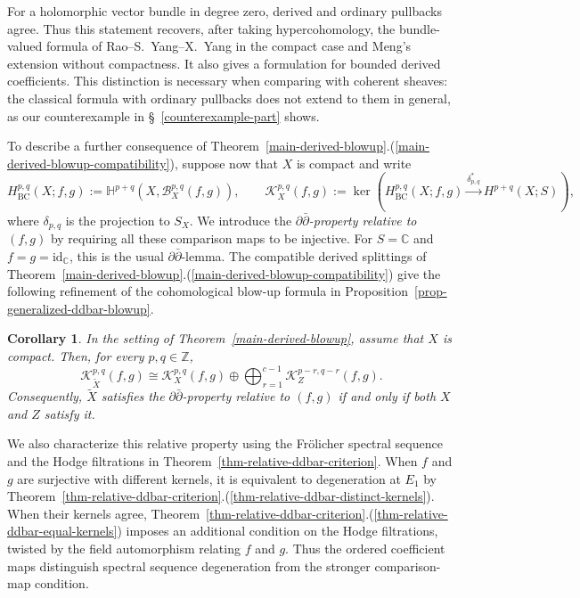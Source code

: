 \documentclass[11pt]{amsart}
\numberwithin{equation}{section}
\theoremstyle{plain}
\newtheorem{cor}[thm]{Corollary}
\theoremstyle{definition}
\begin{document}
For a holomorphic vector bundle in degree zero, derived and ordinary
pullbacks agree.  Thus this statement recovers, after taking
hypercohomology, the bundle-valued formula of Rao--S.~Yang--X.~Yang in the
compact case and Meng's extension without compactness.  It also gives
a formulation for bounded derived coefficients.  This distinction is
necessary when comparing with coherent sheaves: the classical formula
with ordinary pullbacks does not extend to them in general, as our
counterexample in \S~\ref{counterexample-part} shows.

To describe a further consequence of
Theorem~\ref{main-derived-blowup}.(\ref{main-derived-blowup-compatibility}),
suppose now that $X$ is compact and
write
\[
H^{p,q}_{\mathrm{BC}}(X;f,g)
:=\mathbb H^{p+q}(X,\mathcal B_X^{p,q}(f,g)),\qquad
\mathcal K_X^{p,q}(f,g):=
\ker\!\left(H^{p,q}_{\mathrm{BC}}(X;f,g)
\xrightarrow{\delta_{p,q}^*}H^{p+q}(X;S)\right),
\]
where $\delta_{p,q}$ is the projection to $S_X$.
We introduce the \emph{$\partial\bar\partial$-property relative to
$(f,g)$} by requiring all these comparison maps to be injective.
For $S=\mathbb C$ and $f=g=\mathrm{id}_{\mathbb C}$, this is the
usual $\partial\bar\partial$-lemma.  The compatible derived splittings of
Theorem~\ref{main-derived-blowup}.(\ref{main-derived-blowup-compatibility}) give
the following refinement of the cohomological blow-up formula in
Proposition~\ref{prop-generalized-ddbar-blowup}.

\begin{cor}\label{cor-main-relative-blowup}
In the setting of Theorem~\ref{main-derived-blowup}, assume that $X$
is compact.  Then, for every $p,q\in\mathbb Z$,
\[
\mathcal K_{\tilde{X}}^{p,q}(f,g)
\cong\mathcal K_X^{p,q}(f,g)\oplus
\bigoplus_{r=1}^{c-1}\mathcal K_Z^{p-r,q-r}(f,g).
\]
Consequently, $\tilde{X}$ satisfies the $\partial\bar\partial$-property
relative to $(f,g)$ if and only if both $X$ and $Z$ satisfy it.
\end{cor}

We also characterize this relative property using the Fr\"olicher
spectral sequence and the Hodge filtrations in
Theorem~\ref{thm-relative-ddbar-criterion}.  When $f$ and $g$ are
surjective with different kernels, it is equivalent to degeneration
at $E_1$ by Theorem~\ref{thm-relative-ddbar-criterion}.(\ref{thm-relative-ddbar-distinct-kernels}).
When their kernels agree, Theorem~\ref{thm-relative-ddbar-criterion}.(\ref{thm-relative-ddbar-equal-kernels})
imposes an additional condition on the Hodge filtrations, twisted by
the field automorphism relating $f$ and $g$.  Thus the ordered
coefficient maps distinguish spectral sequence degeneration from the
stronger comparison-map condition.
\end{document}
